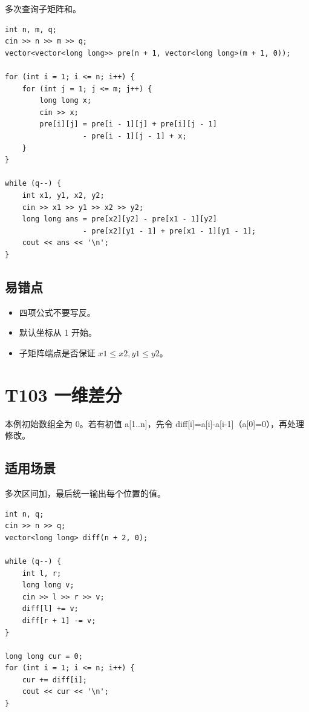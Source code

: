 多次查询子矩阵和。

\begin{lstlisting}
int n, m, q;
cin >> n >> m >> q;
vector<vector<long long>> pre(n + 1, vector<long long>(m + 1, 0));

for (int i = 1; i <= n; i++) {
    for (int j = 1; j <= m; j++) {
        long long x;
        cin >> x;
        pre[i][j] = pre[i - 1][j] + pre[i][j - 1]
                  - pre[i - 1][j - 1] + x;
    }
}

while (q--) {
    int x1, y1, x2, y2;
    cin >> x1 >> y1 >> x2 >> y2;
    long long ans = pre[x2][y2] - pre[x1 - 1][y2]
                  - pre[x2][y1 - 1] + pre[x1 - 1][y1 - 1];
    cout << ans << '\n';
}
\end{lstlisting}

\subsection{易错点}

\begin{itemize}
  \item 四项公式不要写反。
  \item 默认坐标从 1 开始。
  \item 子矩阵端点是否保证 $x1 \le x2, y1 \le y2$。
\end{itemize}

\section{T103 一维差分}\label{sec:09-5}\label{tpl:103}

本例初始数组全为 0。若有初值 a[1..n]，先令 diff[i]=a[i]-a[i-1]（a[0]=0），再处理修改。

\subsection{适用场景}

多次区间加，最后统一输出每个位置的值。

\begin{lstlisting}
int n, q;
cin >> n >> q;
vector<long long> diff(n + 2, 0);

while (q--) {
    int l, r;
    long long v;
    cin >> l >> r >> v;
    diff[l] += v;
    diff[r + 1] -= v;
}

long long cur = 0;
for (int i = 1; i <= n; i++) {
    cur += diff[i];
    cout << cur << '\n';
}
\end{lstlisting}

